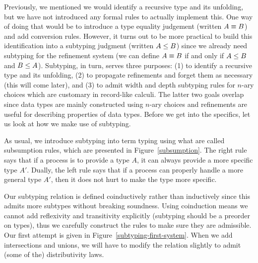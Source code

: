\documentclass[a4paper,USenglish]{lipics-v2016}
\begin{document}
Previously, we mentioned we would identify a recursive type and its unfolding, but we have not introduced any formal rules to actually implement this. One way of doing that would be to introduce a type equality judgement (written $A \equiv B$) and add conversion rules. However, it turns out to be more practical to build this identification into a subtyping judgment (written $A \le B$) since we already need subtyping for the refinement system (we can define $A \equiv B$ if and only if $A \le B$ and $B \le A$). Subtyping, in turn, serves three purposes: (1) to identify a recursive type and its unfolding, (2) to propagate refinements and forget them as necessary (this will come later), and (3) to admit width and depth subtyping rules for $n$-ary choices which are customary in record-like calculi. The latter two goals overlap since data types are mainly constructed using $n$-ary choices and refinements are useful for describing properties of data types. Before we get into the specifics, let us look at how we make use of subtyping.

As usual, we introduce subtyping into term typing using what are called subsumption rules, which are presented in Figure~\ref{subsumption}. The right rule says that if a process is to provide a type $A$, it can always provide a more specific type $A'$. Dually, the left rule says that if a process can properly handle a more general type $A'$, then it does not hurt to make the type more specific.


Our subtyping relation is defined coinductively rather than inductively since this admits more subtypes without breaking soundness. Using coinduction means we cannot add reflexivity and transitivity explicitly (subtyping should be a preorder on types), thus we carefully construct the rules to make sure they are admissible. Our first attempt is given in Figure~\ref{subtyping-first-system}. When we add intersections and unions, we will have to modify the relation slightly to admit (some of the) distributivity laws. 
\end{document}
